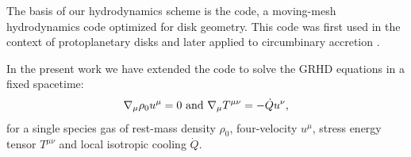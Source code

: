 The basis of our hydrodynamics scheme is the \Disco{} code, a moving-mesh hydrodynamics
code optimized for disk geometry. This code was first used in the context of
protoplanetary disks \citep{Duffell12, Duffell13A, Duffell14} and later applied 
to circumbinary accretion \citep{Farris14, Farris15A, Farris15B}. 

In the present work we have extended the \Disco{} code to solve the GRHD equations in a fixed spacetime:
\begin{equation}
    \nabla_\mu \rho_0 u^\mu = 0 \text{ and } \nabla_\mu T^{\mu\nu} = -\dot{Q} u^\nu , \eqlabel{GRHD}
\end{equation}
for a single species gas of rest-mass density $\rho_0$, four-velocity $u^\mu$, stress energy tensor $T^{\mu\nu}$ and local isotropic cooling $\dot{Q}$.  

